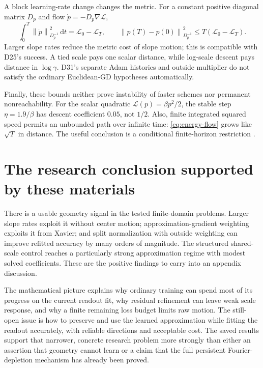 \documentclass[11pt]{article}
\newcommand{\norm}[1]{\left\lVert#1\right\rVert}
\newcommand{\dd}{\,\mathrm d}
\begin{document}
A block learning-rate change changes the metric. For a constant positive diagonal matrix $D_p$ and flow $\dot p=-D_p\nabla\mathcal L$,
\begin{equation}
 \int_0^T\norm{\dot p}_{D_p^{-1}}^2\dd t=\mathcal L_0-\mathcal L_T,
 \qquad
 \norm{p(T)-p(0)}_{D_p^{-1}}^2\leq T(\mathcal L_0-\mathcal L_T).
\end{equation}
Larger slope rates reduce the metric cost of slope motion; this is compatible with D25's success. A tied scale pays one scalar distance, while log-scale descent pays distance in $\log\gamma$. D31's separate Adam histories and outside multiplier do not satisfy the ordinary Euclidean-GD hypotheses automatically.

Finally, these bounds neither prove instability of faster schemes nor permanent nonreachability. For the scalar quadratic $\mathcal L(p)=\beta p^2/2$, the stable step $\eta=1.9/\beta$ has descent coefficient $0.05$, not $1/2$. Also, finite integrated squared speed permits an unbounded path over infinite time: \eqref{eq:energy-flow} grows like $\sqrt T$ in distance. The useful conclusion is a conditional finite-horizon restriction \cite{energy}.

\section{The research conclusion supported by these materials}

There is a usable geometry signal in the tested finite-domain problems. Larger slope rates exploit it without center motion; approximation-gradient weighting exploits it from Xavier; and split normalization with outside weighting can improve refitted accuracy by many orders of magnitude. The structured shared-scale control reaches a particularly strong approximation regime with modest solved coefficients. These are the positive findings to carry into an appendix discussion.

The mathematical picture explains why ordinary training can spend most of its progress on the current readout fit, why residual refinement can leave weak scale response, and why a finite remaining loss budget limits raw motion. The still-open issue is how to preserve and use the learned approximation while fitting the readout accurately, with reliable directions and acceptable cost. The saved results support that narrower, concrete research problem more strongly than either an assertion that geometry cannot learn or a claim that the full persistent Fourier-depletion mechanism has already been proved.
\end{document}
